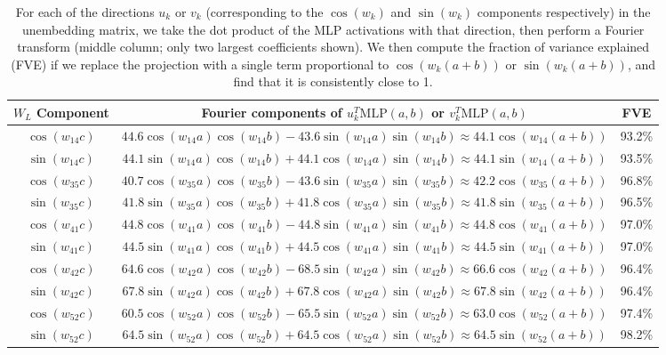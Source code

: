 \documentclass{article} %
\newcommand{\cosp}[1]{\cos \left ( #1 \right )}
\newcommand{\sinp}[1]{\sin \left ( #1 \right )}
\newcommand{\MLP}{\textrm{MLP}}
\begin{document}
\begin{table}[]
    \vspace{-25pt}
    \centering
    \small
    \begin{tabular}{c|c|c}
         $W_{L}$ Component & Fourier components of $u_k^T \MLP(a,b)$ or $v_k^T \MLP(a,b)$ & FVE\\
         \hline 
         $\cosp{w_{14} c}$ & $44.6\cos(w_{14}a)\cos(w_{14} b) - 43.6 \sin(w_{14} a) \sin(w_{14} b) \approx 44.1 \cosp{w_{14} (a+b)}$ & 93.2\%\\
         $\sinp{w_{14} c}$ &  $44.1 \sin(w_{14}a)\cos(w_{14} b) + 44.1 \cos(w_{14} a) \sin(w_{14} b) \approx 44.1 \sinp{w_{14}(a+b)}$ & 93.5\%\\
         $\cosp{w_{35} c}$ & $40.7 \cos(w_{35}a)\cos(w_{35} b) - 43.6 \sin(w_{35} a) \sin(w_{35} b) \approx 42.2 \cosp{w_{35} (a+b)}$ & 96.8\%\\
         $\sinp{w_{35} c}$ &  $41.8 \sin(w_{35}a)\cos(w_{35} b) + 41.8 \cos(w_{35} a) \sin(w_{35} b) \approx 41.8 \sinp{w_{35}(a+b)}$ & 96.5\%\\
         $\cosp{w_{41} c}$ & $44.8 \cos(w_{41}a)\cos(w_{41} b) - 44.8 \sin(w_{41} a) \sin(w_{41} b) \approx 44.8 \cosp{w_{41} (a+b)}$ & 97.0\%\\
         $\sinp{w_{41} c}$ &  $44.5 \sin(w_{41}a)\cos(w_{41} b) + 44.5 \cos(w_{41} a) \sin(w_{41} b) \approx 44.5 \sinp{w_{41}(a+b)}$ & 97.0\%\\
         $\cosp{w_{42} c}$ & $64.6 \cos(w_{42}a)\cos(w_{42} b) - 68.5 \sin(w_{42} a) \sin(w_{42} b) \approx 66.6 \cosp{w_{42} (a+b)}$ & 96.4\%\\
         $\sinp{w_{42} c}$ &  $67.8 \sin(w_{42}a)\cos(w_{42} b) + 67.8 \cos(w_{42} a) \sin(w_{42} b) \approx 67.8 \sinp{w_{42}(a+b)}$ & 96.4\%\\
         $\cosp{w_{52} c}$ & $60.5 \cos(w_{52}a)\cos(w_{52} b) - 65.5 \sin(w_{52} a) \sin(w_{52} b) \approx 63.0 \cosp{w_{52} (a+b)}$ & 97.4\%\\
         $\sinp{w_{52} c}$ &  $64.5 \sin(w_{52}a)\cos(w_{52} b) + 64.5 \cos(w_{52} a) \sin(w_{52} b) \approx 64.5 \sinp{w_{52}(a+b)}$ & 98.2\%\\
    \end{tabular}
    \caption{For each of the directions $u_k$ or $v_k$  (corresponding to the $\cos(w_k)$ and $\sin(w_k)$ components respectively) in the unembedding matrix, we take the dot product of the MLP activations with that direction, then perform a Fourier transform (middle column; only two largest coefficients shown). %
    We then compute the fraction of variance explained (FVE) if we replace the projection with a single term proportional to $\cosp{w_k(a+b)}$ or $\sinp{w_k(a+b)}$, and find that it is consistently close to 1.}
    \label{tab:mlp-activation-projections}
\end{table}
\end{document}
